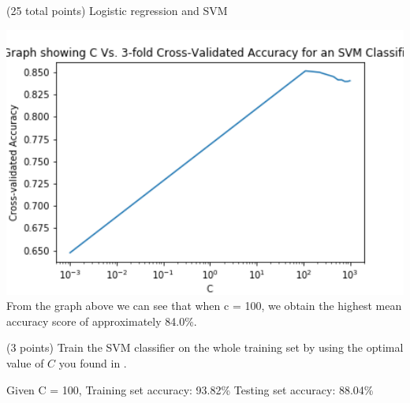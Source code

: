 \documentclass[12pt]{article}
\begin{document}
\begin{question}{(25 total points) Logistic regression and SVM}
\begin{subquestion}
      \begin{answerbox}{30em}
         \includegraphics[width = 1.0\textwidth]{q2_5.png}
         From the graph above we can see that when c = 100, we obtain the highest mean accuracy score of approximately 84.0\%. 
         
      \end{answerbox}
  


   \end{subquestion}
   \begin{subquestion}{(3 points)
       Train the SVM classifier on the whole training set by using the
       optimal value of $C$ you found in . 
     } \label{Q2.6}


       

      \begin{answerbox}{10em}
         Given C = 100,\newline
         Training set accuracy: 93.82\%\newline
         Testing set accuracy: 88.04\%
      \end{answerbox}
  


   \end{subquestion}
%
%

\end{question}
\clearpage
%
%
\end{document}
